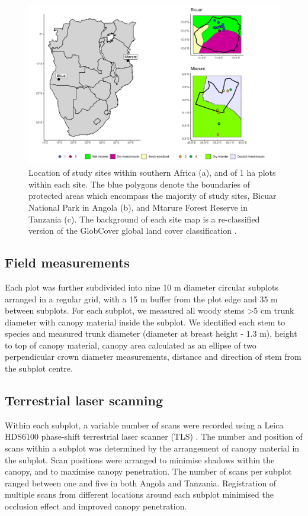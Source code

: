 \documentclass[11pt,a4paper]{article}
\begin{document}
\begin{figure}[H]
\centering
	\includegraphics[width=\textwidth]{map}
	\caption{Location of study sites within southern Africa (a), and of 1 ha plots within each site. The blue polygons denote the boundaries of protected areas which encompass the majority of study sites, Bicuar National Park in Angola (b), and Mtarure Forest Reserve in Tanzania (c). The background of each site map is a re-classified version of the GlobCover global land cover classification \citep{Globcover}.}
	\label{map}
\end{figure}

\subsection{Field measurements}

Each plot was further subdivided into nine 10 m diameter circular subplots arranged in a regular grid, with a 15 m buffer from the plot edge and 35 m between subplots. For each subplot, we measured all woody stems >5 cm trunk diameter with canopy material inside the subplot. We identified each stem to species and measured trunk diameter (diameter at breast height - 1.3 m), height to top of canopy material, canopy area calculated as an ellipse of two perpendicular crown diameter measurements, distance and direction of stem from the subplot centre.

\subsection{Terrestrial laser scanning}

Within each subplot, a variable number of scans were recorded using a Leica HDS6100 phase-shift terrestrial laser scanner (TLS) \citep{Leica}. The number and position of scans within a subplot was determined by the arrangement of canopy material in the subplot. Scan positions were arranged to minimise shadows within the canopy, and to maximise canopy penetration. The number of scans per subplot ranged between one and five in both Angola and Tanzania. Registration of multiple scans from different locations around each subplot minimised the occlusion effect and improved canopy penetration.
\end{document}
